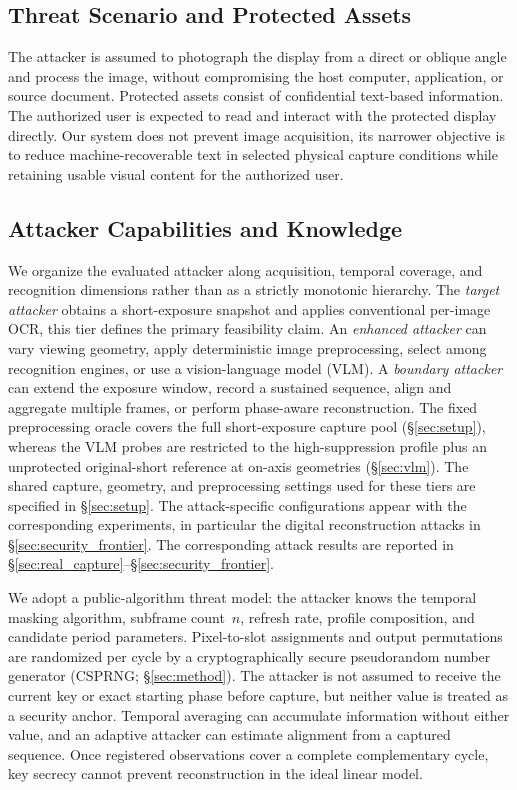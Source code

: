 \documentclass{ieeeaccess}
\begin{document}
\subsection{Threat Scenario and Protected Assets}

The attacker is assumed to photograph the display from a direct or oblique angle and process the image, without compromising the host computer, application, or source document. Protected assets consist of confidential text-based information. The authorized user is expected to read and interact with the protected display directly. Our system does not prevent image acquisition, its narrower objective is to reduce machine-recoverable text in selected physical capture conditions while retaining usable visual content for the authorized user.

\subsection{Attacker Capabilities and Knowledge}

We organize the evaluated attacker along acquisition, temporal coverage, and recognition dimensions rather than as a strictly monotonic hierarchy. The \emph{target attacker} obtains a short-exposure snapshot and applies conventional per-image OCR, this tier defines the primary feasibility claim. An \emph{enhanced attacker} can vary viewing geometry, apply deterministic image preprocessing, select among recognition engines, or use a vision-language model (VLM). A \emph{boundary attacker} can extend the exposure window, record a sustained sequence, align and aggregate multiple frames, or perform phase-aware reconstruction. The fixed preprocessing oracle covers the full short-exposure capture pool (\S\ref{sec:setup}), whereas the VLM probes are restricted to the high-suppression profile plus an unprotected original-short reference at on-axis geometries (\S\ref{sec:vlm}). The shared capture, geometry, and preprocessing settings used for these tiers are specified in \S\ref{sec:setup}. The attack-specific configurations appear with the corresponding experiments, in particular the digital reconstruction attacks in \S\ref{sec:security_frontier}. The corresponding attack results are reported in \S\ref{sec:real_capture}--\S\ref{sec:security_frontier}.

We adopt a public-algorithm threat model: the attacker knows the temporal masking algorithm, subframe count~$n$, refresh rate, profile composition, and candidate period parameters. Pixel-to-slot assignments and output permutations are randomized per cycle by a cryptographically secure pseudorandom number generator (CSPRNG; \S\ref{sec:method}). The attacker is not assumed to receive the current key or exact starting phase before capture, but neither value is treated as a security anchor. Temporal averaging can accumulate information without either value, and an adaptive attacker can estimate alignment from a captured sequence. Once registered observations cover a complete complementary cycle, key secrecy cannot prevent reconstruction in the ideal linear model.
\end{document}
